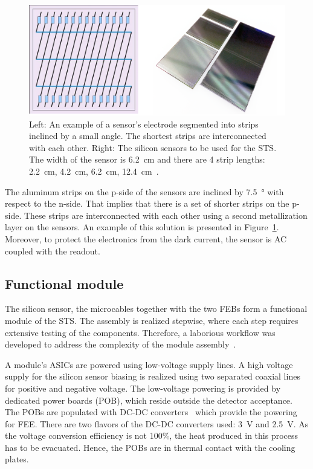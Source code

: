 \begin{figure}[!h]
\centering
\includegraphics[width=0.75\columnwidth]{Chapter2/images/silicon_sensors.png}
\caption{Left: An example of a sensor's electrode segmented into strips inclined by a small angle. The shortest strips are interconnected with each other. Right: The silicon sensors to be used for the \gls{STS}. The width of the sensor is \SI{6.2}{\centi\metre} and there are 4 strip lengths: \SI{2.2}{\centi\metre}, \SI{4.2}{\centi\metre}, \SI{6.2}{\centi\metre}, \SI{12.4}{\centi\metre}~\cite{Heuser:54798}.}
\label{fig_sts_si}
\end{figure}

The aluminum strips on the p-side of the sensors are inclined by \SI{7.5}{\degree} with respect to the n-side. That implies that there is a set of shorter strips on the p-side. These strips are interconnected with each other using a second metallization layer on the sensors. An example of this solution is presented in Figure~\ref{fig_sts_si}. Moreover, to protect the electronics from the dark current, the sensor is AC coupled with the readout.
\subsection{Functional module}
\label{sts_module}
The silicon sensor, the microcables together with the two \glspl{FEB} form a functional module of the \gls{STS}. The assembly is realized stepwise, where each step requires extensive testing of the components. Therefore, a laborious workflow was developed to address the complexity of the module assembly~\cite{carmen2}. 

A module's ASICs are powered using low-voltage supply lines. A high voltage supply for the silicon sensor biasing is realized using two separated coaxial lines for positive and negative voltage. The low-voltage powering is provided by dedicated power boards (\gls{POB}), which reside outside the detector acceptance. The \glspl{POB} are populated with DC-DC converters~\cite{DC_DC_converter} which provide the powering for \gls{FEE}. There are two flavors of the DC-DC converters used: 3~V and 2.5~V. As the voltage conversion efficiency is not 100\%, the heat produced in this process has to be evacuated. Hence, the \glspl{POB} are in thermal contact with the cooling plates. 

